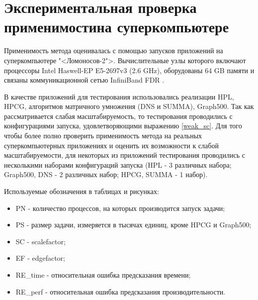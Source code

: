 \section{Экспериментальная проверка применимости на суперкомпьютере}
	Применимость метода оценивалась с помощью запусков приложений на суперкомпьютере "<Ломоносов-2">. Вычислительные узлы которого включают процессоры Intel Haswell-EP E5-2697v3 (2.6 GHz), оборудованы 64 GB памяти и связаны коммуникационной сетью InfiniBand FDR \cite{Lom2_stat}.

	В качестве приложений для тестирования использовались реализации HPL, HPCG, алгоритмов матричного умножения (DNS и SUMMA), Graph500. Так как рассматривается слабая масштабируемость, то тестирования проводились с конфигурациями запуска, удовлетворяющими выражению \eqref{weak_sc}. Для того чтобы более полно проверить применимость метода на реальных суперкомпьютерных приложениях и оценить их возможности к слабой масштабируемости, для некоторых из приложений тестирования проводились с несколькими наборами конфигураций запуска (HPL - 3 различных набора; Graph500, DNS - 2 различных набор; HPCG, SUMMA - 1 набор).

	Используемые обозначения в таблицах и рисунках:
	\begin{itemize}
		\item PN - количество процессов, на которых производится запуск задачи;
		\item PS - размер задачи, измеряется в тысячах единиц, кроме HPCG и Graph500; 
		\item SC - scalefactor;
		\item EF - edgefactor;
		\item RE\_time - относительная ошибка предсказания времени;
		\item RE\_perf - относительная ошибка предсказания производительности.
	\end{itemize}

